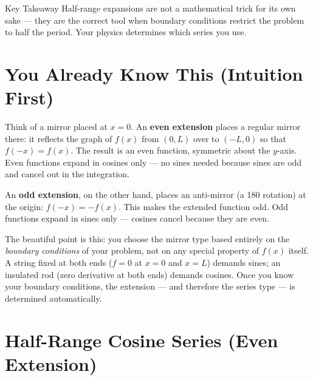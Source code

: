 \documentclass[12pt,a4paper]{article}
\begin{document}
\begin{learnbox}{Key Takeaway}
Half-range expansions are not a mathematical trick for its own sake --- they are the correct tool when boundary conditions restrict the problem to half the period. Your physics determines which series you use.
\end{learnbox}

\section{You Already Know This (Intuition First)}

Think of a mirror placed at $x = 0$. An \textbf{even extension} places a regular mirror there: it reflects the graph of $f(x)$ from $(0,L)$ over to $(-L,0)$ so that $f(-x) = f(x)$. The result is an even function, symmetric about the $y$-axis. Even functions expand in cosines only --- no sines needed because sines are odd and cancel out in the integration.

An \textbf{odd extension}, on the other hand, places an anti-mirror (a 180\textdegree{} rotation) at the origin: $f(-x) = -f(x)$. This makes the extended function odd. Odd functions expand in sines only --- cosines cancel because they are even.

The beautiful point is this: you choose the mirror type based entirely on the \emph{boundary conditions} of your problem, not on any special property of $f(x)$ itself. A string fixed at both ends ($f=0$ at $x=0$ and $x=L$) demands sines; an insulated rod (zero derivative at both ends) demands cosines. Once you know your boundary conditions, the extension --- and therefore the series type --- is determined automatically.

\section{Half-Range Cosine Series (Even Extension)}
\end{document}

